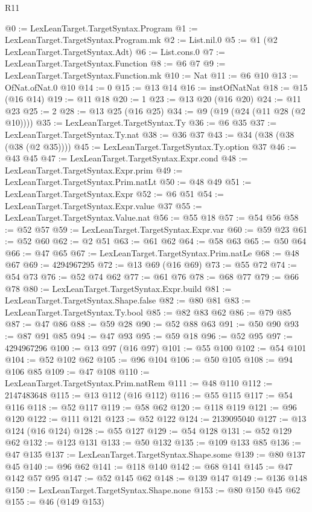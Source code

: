 \begin{lexlean}{R11}
\begin{coremodule}
@0 := LexLeanTarget.TargetSyntax.Program
@1 := LexLeanTarget.TargetSyntax.Program.mk
@2 := List.nil.{0}
@5 := @1 (@2 LexLeanTarget.TargetSyntax.Adt)
@6 := List.cons.{0}
@7 := LexLeanTarget.TargetSyntax.Function
@8 := @6 @7
@9 := LexLeanTarget.TargetSyntax.Function.mk
@10 := Nat
@11 := @6 @10
@13 := OfNat.ofNat.{0} @10
@14 := 0
@15 := @13 @14
@16 := instOfNatNat
@18 := @15 (@16 @14)
@19 := @11 @18
@20 := 1
@23 := @13 @20 (@16 @20)
@24 := @11 @23
@25 := 2
@28 := @13 @25 (@16 @25)
@34 := @9 (@19 (@24 (@11 @28 (@2 @10))))
@35 := LexLeanTarget.TargetSyntax.Ty
@36 := @6 @35
@37 := LexLeanTarget.TargetSyntax.Ty.nat
@38 := @36 @37
@43 := @34 (@38 (@38 (@38 (@2 @35))))
@45 := LexLeanTarget.TargetSyntax.Ty.option @37
@46 := @43 @45
@47 := LexLeanTarget.TargetSyntax.Expr.cond
@48 := LexLeanTarget.TargetSyntax.Expr.prim
@49 := LexLeanTarget.TargetSyntax.Prim.natLt
@50 := @48 @49
@51 := LexLeanTarget.TargetSyntax.Expr
@52 := @6 @51
@54 := LexLeanTarget.TargetSyntax.Expr.value @37
@55 := LexLeanTarget.TargetSyntax.Value.nat
@56 := @55 @18
@57 := @54 @56
@58 := @52 @57
@59 := LexLeanTarget.TargetSyntax.Expr.var
@60 := @59 @23
@61 := @52 @60
@62 := @2 @51
@63 := @61 @62
@64 := @58 @63
@65 := @50 @64
@66 := @47 @65
@67 := LexLeanTarget.TargetSyntax.Prim.natLe
@68 := @48 @67
@69 := 4294967295
@72 := @13 @69 (@16 @69)
@73 := @55 @72
@74 := @54 @73
@76 := @52 @74 @62
@77 := @61 @76
@78 := @68 @77
@79 := @66 @78
@80 := LexLeanTarget.TargetSyntax.Expr.build
@81 := LexLeanTarget.TargetSyntax.Shape.false
@82 := @80 @81
@83 := LexLeanTarget.TargetSyntax.Ty.bool
@85 := @82 @83 @62
@86 := @79 @85
@87 := @47 @86
@88 := @59 @28
@90 := @52 @88 @63
@91 := @50 @90
@93 := @87 @91 @85
@94 := @47 @93
@95 := @59 @18
@96 := @52 @95
@97 := 4294967296
@100 := @13 @97 (@16 @97)
@101 := @55 @100
@102 := @54 @101
@104 := @52 @102 @62
@105 := @96 @104
@106 := @50 @105
@108 := @94 @106 @85
@109 := @47 @108
@110 := LexLeanTarget.TargetSyntax.Prim.natRem
@111 := @48 @110
@112 := 2147483648
@115 := @13 @112 (@16 @112)
@116 := @55 @115
@117 := @54 @116
@118 := @52 @117
@119 := @58 @62
@120 := @118 @119
@121 := @96 @120
@122 := @111 @121
@123 := @52 @122
@124 := 2139095040
@127 := @13 @124 (@16 @124)
@128 := @55 @127
@129 := @54 @128
@131 := @52 @129 @62
@132 := @123 @131
@133 := @50 @132
@135 := @109 @133 @85
@136 := @47 @135
@137 := LexLeanTarget.TargetSyntax.Shape.some
@139 := @80 @137 @45
@140 := @96 @62
@141 := @118 @140
@142 := @68 @141
@145 := @47 @142 @57 @95
@147 := @52 @145 @62
@148 := @139 @147
@149 := @136 @148
@150 := LexLeanTarget.TargetSyntax.Shape.none
@153 := @80 @150 @45 @62
@155 := @46 (@149 @153)

\end{coremodule}
\end{lexlean}
